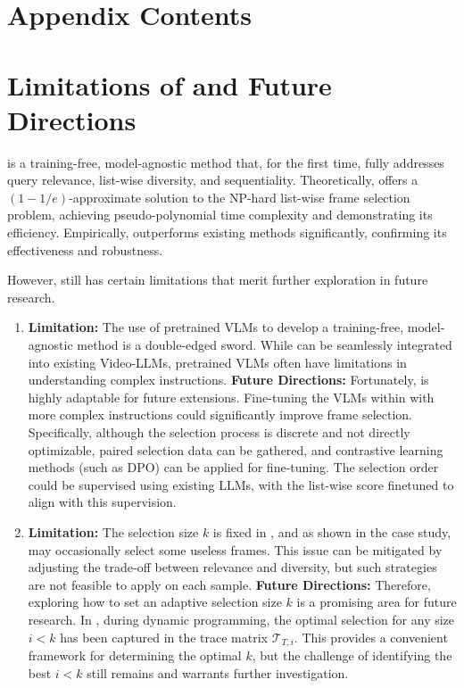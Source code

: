 \clearpage
\appendix
\setcounter{page}{1}
\maketitlesupplementary

\section*{Appendix Contents}

\startcontents[appendices]


\newpage


\newpage


\newpage
\section{Limitations of \mname{} and Future Directions}
\mname{} is a training-free, model-agnostic method that, for the first time, fully addresses query relevance, list-wise diversity, and sequentiality.
Theoretically, \mname{} offers a \((1 - 1/e)\)-approximate solution to the NP-hard list-wise frame selection problem, achieving pseudo-polynomial time complexity and demonstrating its efficiency.
Empirically, \mname{} outperforms existing methods significantly, confirming its effectiveness and robustness.

However, \mname{} still has certain limitations that merit further exploration in future research.
\begin{enumerate}
    \item 
    	\textbf{Limitation:} The use of pretrained VLMs to develop a training-free, model-agnostic method is a double-edged sword. 
    	While \mname{} can be seamlessly integrated into existing Video-LLMs, pretrained VLMs often have limitations in understanding complex instructions.
    	\textbf{Future Directions:} Fortunately, \mname{} is highly adaptable for future extensions. 
    	Fine-tuning the VLMs within \mname{} with more complex instructions could significantly improve frame selection.
    	Specifically, although the selection process is discrete and not directly optimizable, paired selection data can be gathered, and contrastive learning methods (such as DPO) can be applied for fine-tuning.
    	The selection order could be supervised using existing LLMs, with the list-wise score finetuned to align with this supervision.
    \item 
    	\textbf{Limitation:} The selection size $k$ is fixed in \mname{}, and as shown in the case study, \mname{} may occasionally select some useless frames.
    	This issue can be mitigated by adjusting the trade-off between relevance and diversity, but such strategies are not feasible to apply on each sample.
		\textbf{Future Directions:} Therefore, exploring how to set an adaptive selection size $k$ is a promising area for future research. In \mname{}, during dynamic programming, the optimal selection for any size $i < k$ has been captured in the trace matrix $\mathcal{T}_{T,i}$. This provides a convenient framework for determining the optimal $k$, but the challenge of identifying the best $i < k$ still remains and warrants further investigation.
\end{enumerate}


